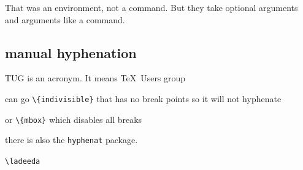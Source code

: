 \documentclass[letterpaper,11pt]{article}
\begin{document}
That was an environment, not a command. But they take optional arguments and arguments like a command.

\subsection{manual hyphenation}
\parbox{3cm}{TUG is an acronym.  It means \TeX\ Users group}
\quad


\newcommand{\packex}[1]{\texttt{\textbackslash#1}}

can go \texttt{\textbackslash\{indivisible\}} that has no break points so it will not hyphenate

or \texttt{\textbackslash\{mbox\}} which disables all breaks

there is also the \texttt{hyphenat} package. 

\packex{ladeeda}
\end{document}
